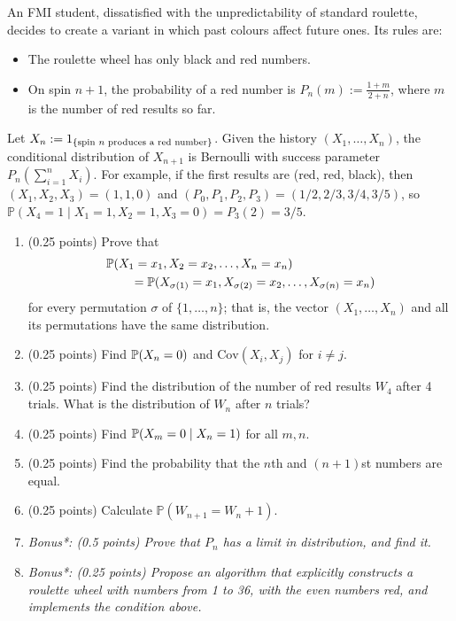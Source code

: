 \documentclass[a4paper]{report}
\begin{document}
\begin{problem}
An FMI student, dissatisfied with the unpredictability of standard roulette, decides to create a variant in which past colours affect future ones. Its rules are:
\begin{itemize}
\item The roulette wheel has only black and red numbers.
\item On spin $n+1$, the probability of a red number is $P_n(m):=\frac{1+m}{2+n}$, where $m$ is the number of red results so far.
\end{itemize}
Let $X_n:=\ind{\{\text{spin $n$ produces a red number}\}}$. Given the history $(X_1,\ldots,X_n)$, the conditional distribution of $X_{n+1}$ is Bernoulli with success parameter $P_n(\sum_{i=1}^nX_i)$. For example, if the first results are (red, red, black), then $(X_1,X_2,X_3)=(1,1,0)$ and $(P_0,P_1,P_2,P_3)=(1/2,2/3,3/4,3/5)$, so $\mathbb P(X_4=1\mid X_1=1,X_2=1,X_3=0)=P_3(2)=3/5$.
\begin{enumerate}
\item (0.25 points) Prove that
\begin{align*}
&\P(X_1=x_1,X_2=x_2,\dots,X_n=x_n)\\
&\qquad=\P(X_{\sigma(1)}=x_1,X_{\sigma(2)}=x_2,\dots,X_{\sigma(n)}=x_n)
\end{align*}
for every permutation $\sigma$ of $\{1,\ldots,n\}$; that is, the vector $(X_1,\dots,X_n)$ and all its permutations have the same distribution.
\item (0.25 points) Find $\P(X_n=0)$ and $\mbox{Cov}(X_i,X_j)$ for $i\neq j$.
\item (0.25 points) Find the distribution of the number of red results $W_4$ after 4 trials. What is the distribution of $W_n$ after $n$ trials?
\item (0.25 points) Find $\P(X_m=0\mid X_n=1)$ for all $m,n$.
\item (0.25 points) Find the probability that the $n$th and $(n+1)$st numbers are equal.
\item (0.25 points) Calculate $\mathbb P(W_{n+1}=W_n+1)$.
\item \textit{Bonus*: (0.5 points) Prove that $P_n$ has a limit in distribution, and find it.}
\item \textit{Bonus*: (0.25 points) Propose an algorithm that explicitly constructs a roulette wheel with numbers from 1 to 36, with the even numbers red, and implements the condition above.}
\end{enumerate}
\end{problem}
\end{document}
